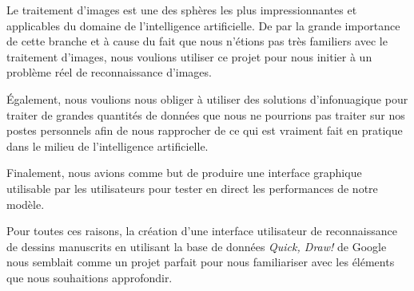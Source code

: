 Le traitement d'images est une des sphères les plus impressionnantes et applicables du domaine de l'intelligence artificielle. 
De par la grande importance de cette branche et à cause du fait que nous n'étions pas très familiers avec le traitement d'images, nous voulions utiliser ce projet pour nous initier à un problème réel de reconnaissance d'images.

Également, nous voulions nous obliger à utiliser des solutions d'infonuagique pour traiter de grandes quantités de données que nous ne pourrions pas traiter sur nos postes personnels afin de nous rapprocher de ce qui est vraiment fait en pratique dans le milieu de l'intelligence artificielle. 

Finalement, nous avions comme but de produire une interface graphique utilisable par les utilisateurs pour tester en direct les performances de notre modèle.

Pour toutes ces raisons, la création d'une interface utilisateur de reconnaissance de dessins manuscrits en utilisant la base de données \emph{Quick, Draw!} de Google nous semblait comme un projet parfait pour nous familiariser avec les éléments que nous souhaitions approfondir.
